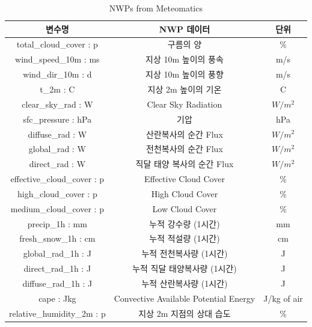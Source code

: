 \documentclass{article}
\begin{document}
\begin{table}[h]
    \begin{tabular}{@{}|c|c|c|@{}}
    \toprule
    \textbf{변수명}                & \textbf{NWP 데이터}                      & \textbf{단위} \\ \midrule
    total\_cloud\_cover : p     & 구름의 양                                 & \%          \\
    wind\_speed\_10m : ms       & 지상 10m 높이의 풍속                         & m/s         \\
    wind\_dir\_10m : d          & 지상 10m 높이의 풍향                         & m/s         \\
    t\_2m : C                   & 지상 2m 높이의 기온                          & C           \\
    clear\_sky\_rad : W         & Clear Sky Radiation                   & $W/m^2$     \\
    sfc\_pressure : hPa         & 기압                                    & hPa         \\
    diffuse\_rad : W            & 산란복사의 순간 Flux                         & $W/m^2$     \\
    global\_rad : W             & 전천복사의 순간 Flux                         & $W/m^2$     \\
    direct\_rad : W             & 직달 태양 복사의 순간 Flux                     & $W/m^2$     \\
    effective\_cloud\_cover : p & Effective Cloud Cover                 & \%          \\
    high\_cloud\_cover : p      & High Cloud Cover                      & \%          \\
    medium\_cloud\_cover : p    & Low Cloud Cover                       & \%          \\
    precip\_1h : mm             & 누적 강수량 (1시간)                          & mm          \\
    fresh\_snow\_1h : cm        & 누적 적설량 (1시간)                          & cm          \\
    global\_rad\_1h : J         & 누적 전천복사량 (1시간)                        & J           \\
    direct\_rad\_1h : J         & 누적 직달 태양복사량 (1시간)                     & J           \\
    diffuse\_rad\_1h : J        & 누적 산란복사량 (1시간)                        & J           \\
    cape : Jkg                  & Convective Available Potential Energy & J/kg of air \\
    relative\_humidity\_2m : p  & 지상 2m 지점의 상대 습도                       & \%          \\ \bottomrule
\end{tabular}
\caption{\label{tab:table_1}NWPs from Meteomatics}
\end{table}
\end{document}
